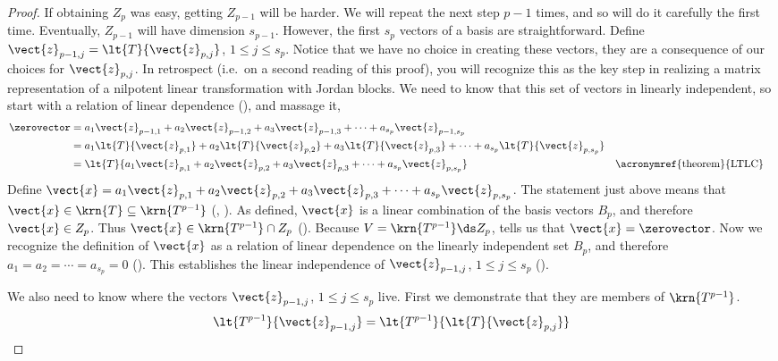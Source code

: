 \begin{proof}
%
If obtaining $Z_p$ was easy, getting $Z_{p-1}$ will be harder.  We will repeat the next step $p-1$ times, and so will do it carefully the first time.  Eventually, $Z_{p-1}$ will have dimension $s_{p-1}$.  However, the first $s_p$ vectors of a basis are straightforward.  Define $\vect{z}_{p-1,j}=\lt{T}{\vect{z}_{p,j}}$, $1\leq j\leq s_p$.  Notice that we have no choice in creating these vectors, they are a consequence of our choices for $\vect{z}_{p,j}$.  In retrospect (i.e.\ on a second reading of this proof), you will recognize  this as the key step in realizing a matrix representation of a nilpotent linear transformation with Jordan blocks.  We need to know that this set of vectors in linearly independent, so start with a relation of linear dependence (), and massage it, 
%
\begin{align*}
\zerovector
&=
a_1\vect{z}_{p-1,1}+
a_2\vect{z}_{p-1,2}+
a_3\vect{z}_{p-1,3}+
\cdots+
a_{s_p}\vect{z}_{p-1,s_p}\\
%
&=
a_1\lt{T}{\vect{z}_{p,1}}+
a_2\lt{T}{\vect{z}_{p,2}}+
a_3\lt{T}{\vect{z}_{p,3}}+
\cdots+
a_{s_p}\lt{T}{\vect{z}_{p,s_p}}\\
%
&=\lt{T}{
a_1\vect{z}_{p,1}+
a_2\vect{z}_{p,2}+
a_3\vect{z}_{p,3}+
\cdots+
a_{s_p}\vect{z}_{p,s_p}
}
&&\text{\acronymref{theorem}{LTLC}}\\
\end{align*}
%
Define 
$\vect{x}=
a_1\vect{z}_{p,1}+a_2\vect{z}_{p,2}+a_3\vect{z}_{p,3}+\cdots+a_{s_p}\vect{z}_{p,s_p}$.  
The statement just above means that $\vect{x}\in\krn{T}\subseteq\krn{T^{p-1}}$  (, ).  As defined, $\vect{x}$ is a linear combination of the basis vectors $B_p$, and therefore $\vect{x}\in Z_p$.  Thus $\vect{x}\in\krn{T^{p-1}}\cap Z_p$ ().  Because $V=\krn{T^{p-1}}\ds Z_p$,  tells us that $\vect{x}=\zerovector$.  Now we recognize the definition of $\vect{x}$ as a relation of linear dependence on the linearly independent set $B_p$, and therefore $a_1=a_2=\cdots=a_{s_p}=0$ (). This establishes the linear independence of $\vect{z}_{p-1,j}$, $1\leq j\leq s_p$ ().\par
%
We also need to know where the vectors $\vect{z}_{p-1,j}$, $1\leq j\leq s_p$ live.  First we demonstrate that they are members of $\krn{T^{p-1}}$.
%
\begin{align*}
\lt{T^{p-1}}{\vect{z}_{p-1,j}}
&=\lt{T^{p-1}}{\lt{T}{\vect{z}_{p,j}}}\\

\end{align*}
\end{proof}
